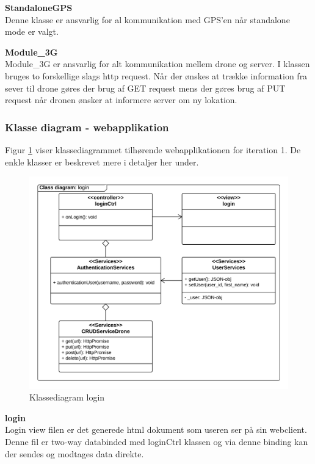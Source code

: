 \textbf{StandaloneGPS}\\
Denne klasse er ansvarlig for al kommunikation med GPS'en når standalone mode er valgt. 

\textbf{Module\_3G} \\
Module\_3G er ansvarlig for alt kommunikation mellem drone og server. I klassen bruges to forskellige slags http request. Når der ønskes at trække information fra sever til drone gøres der brug af GET request mens der gøres brug af PUT request når dronen ønsker at informere server om ny lokation.

\newpage

\subsubsection*{Klasse diagram - webapplikation}
\vspace{-0.1cm}
Figur \ref{fig:classDiagram_login} viser klassediagrammet tilhørende webapplikationen for iteration 1. De enkle klasser er beskrevet mere i detaljer her under.
\begin{figure}[H]
	\centering
	\includegraphics[width=1\textwidth]{Billeder/klasse_diagrammer/login_class_diagram.png}
	\vspace{-0.5cm}
	\caption{Klassediagram login}
	\label{fig:classDiagram_login}
\end{figure}

\newpage

\textbf{login} \\
Login view filen er det generede html dokument som useren ser på sin webclient. Denne fil er two-way databinded med loginCtrl klassen og via denne binding kan der sendes og modtages data direkte.

